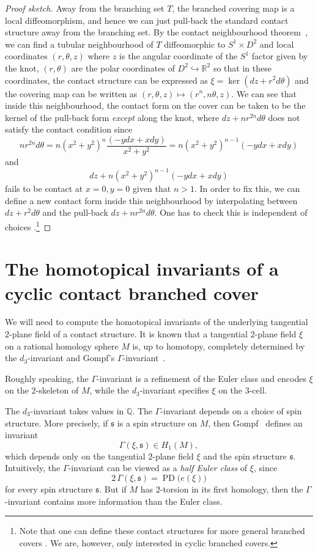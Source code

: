 \documentclass[11pt]{amsart}
\theoremstyle{definition}
\theoremstyle{definition}
\theoremstyle{definition}
\theoremstyle{definition}
\newcommand{\Q}{\mathbb{Q}}
\begin{document}
\begin{proof}[Proof sketch]
    Away from the branching set $T$, the branched covering map is a local diffeomorphism, and hence we can just pull-back the standard contact structure away from the branching set. By the contact neighbourhood theorem~\cite{Geiges}, we can find a tubular neighbourhood of $T$ diffeomorphic to $S^1 \times D^2$ and local coordinates $(r,\theta,z)$ where $z$ is the angular coordinate of the $S^1$ factor given by the knot, $(r,\theta)$ are the polar coordinates of $D^2 \hookrightarrow\mathbb{R}^2$ so that in these coordinates, the contact structure can be expressed as $\xi = \ker (dz+r^2 d\theta)$ and the covering map can be written as $(r,\theta,z) \mapsto(r^n,n\theta,z)$. We can see that inside this neighbourhood, the contact form on the cover can be taken to be the kernel of the pull-back form \emph{except} along the knot, where $dz+nr^{2n}d\theta$ does not satisfy the contact condition since 
$$ nr^{2n}d\theta=n(x^2+y^2)^n\frac{(-ydx+xdy)}{x^2+y^2}=n(x^2+y^2)^{n-1}(-ydx+xdy)$$
and
$$ dz+n(x^2+y^2)^{n-1}(-ydx+xdy)$$ fails to be contact at $x=0,y=0$ given that $n >1.$
In order to fix this, we can define a new contact form inside this neighbourhood by interpolating between $dz+r^2d\theta$ and the pull-back  $dz+nr^{2n}d\theta$. One has to check this is independent of choices \cite{Plamenevskaya_DBC}.\footnote{Note that one can define these contact structures for more general branched covers \cite{Geiges,Gonzalo}. We are, however, only interested in cyclic branched covers.}
\end{proof}

\section{The homotopical invariants of a cyclic contact branched cover}

We will need to compute the homotopical invariants of the underlying tangential $2$-plane field of a contact structure. It is known that a tangential $2$-plane field $\xi$ on a rational homology sphere $M$ is, up to homotopy, completely determined by the $d_3$-invariant and Gompf's $\Gamma$-invariant~\cite{Gompf_Stein,DingGeigesStipsicz_surgery}.

Roughly speaking, the $\Gamma$-invariant is a refinement of the Euler class and encodes $\xi$ on the $2$-skeleton of $M$, while the $d_3$-invariant specifies $\xi$ on the $3$-cell.

The $d_3$-invariant takes values in $\Q$. The $\Gamma$-invariant depends on a choice of spin structure. More precisely, if $\mathfrak{s}$ is a spin structure on $M$, then Gompf~\cite{Gompf_Stein} defines an invariant
\[
\Gamma(\xi,\mathfrak{s}) \in H_1(M),
\]
which depends only on the tangential $2$-plane field $\xi$ and the spin structure $\mathfrak{s}$. Intuitively, the $\Gamma$-invariant can be viewed as a \emph{half Euler class} of $\xi$, since
\[
2\,\Gamma(\xi,\mathfrak{s}) = \operatorname{PD}\bigl(e(\xi)\bigr)
\]
for every spin structure $\mathfrak{s}$. But if $M$ has $2$-torsion in its first homology, then the $\Gamma$-invariant contains more information than the Euler class.
\end{document}
